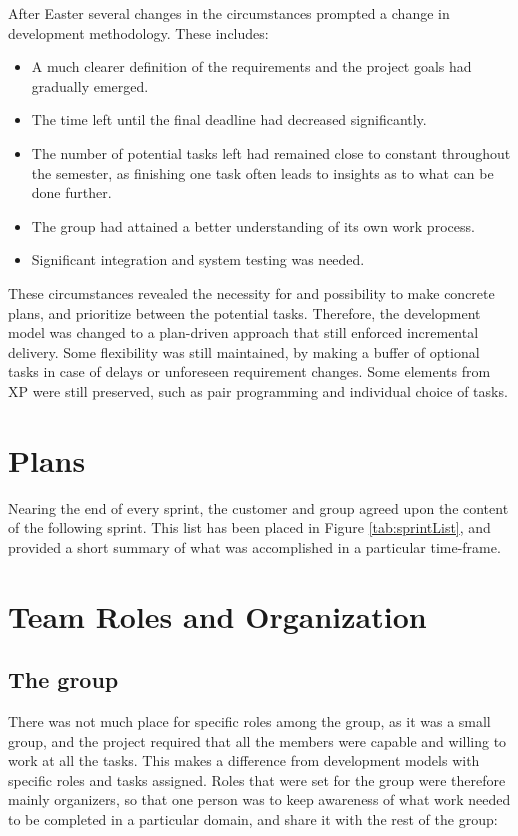 After Easter several changes in the circumstances prompted a change in development methodology. These includes:
\begin{itemize}
\item A much clearer definition of the requirements and the project goals had gradually emerged. 
\item The time left until the final deadline had decreased significantly.
\item The number of potential tasks left had remained close to constant throughout the semester, as finishing one task often leads to insights as to what can be done further.
\item The group had attained a better understanding of its own work process. 
\item Significant integration and system testing was needed.
\end{itemize}
These circumstances revealed the necessity for and possibility to make concrete plans, and prioritize between the potential tasks. Therefore,  the development model was changed to a plan-driven approach that still enforced incremental delivery. Some flexibility was still maintained, by making a buffer of optional tasks in case of delays or unforeseen requirement changes. Some elements from XP were still preserved, such as pair programming and individual choice of tasks.




\section{Plans}

Nearing the end of every sprint, the customer and group agreed upon the content of the following sprint. This list has been placed in Figure \ref{tab:sprintList}, and provided a short summary of what was accomplished in a particular time-frame. 


\section{Team Roles and Organization}
\subsection{The group} \label{def:the group}
There was not much place for specific roles among the group, as it was a small group, and the project required that all the members were capable and willing to work at all the tasks. This makes a difference from development models with specific roles and tasks assigned. Roles that were set for the group were therefore mainly organizers, so that one person was to keep awareness of what work needed to be completed in a particular domain, and share it with the rest of the group:

